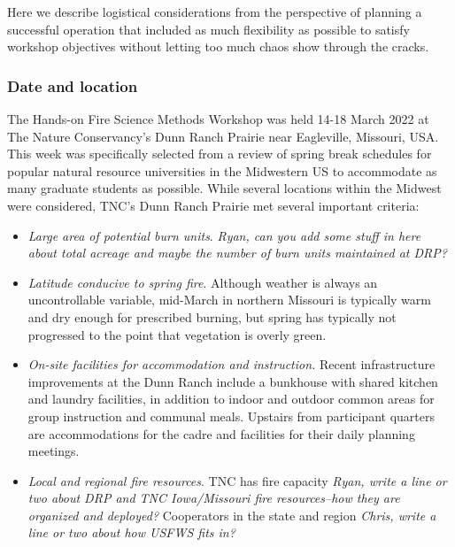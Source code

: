 \documentclass[fire,article,submit,moreauthors,pdftex]{Definitions/mdpi}
\begin{document}
Here we describe logistical considerations from the perspective of planning a successful operation that included as much flexibility as possible to satisfy workshop objectives without letting too much chaos show through the cracks.

\hypertarget{date-and-location}{%
\subsubsection{Date and location}\label{date-and-location}}

The Hands-on Fire Science Methods Workshop was held 14-18 March 2022 at The Nature Conservancy's Dunn Ranch Prairie near Eagleville, Missouri, USA.
This week was specifically selected from a review of spring break schedules for popular natural resource universities in the Midwestern US to accommodate as many graduate students as possible.
While several locations within the Midwest were considered, TNC's Dunn Ranch Prairie met several important criteria:

\begin{itemize}
\item
  \emph{Large area of potential burn units}. \emph{Ryan, can you add some stuff in here about total acreage and maybe the number of burn units maintained at DRP?}
\item
  \emph{Latitude conducive to spring fire}.
  Although weather is always an uncontrollable variable, mid-March in northern Missouri is typically warm and dry enough for prescribed burning, but spring has typically not progressed to the point that vegetation is overly green.
\item
  \emph{On-site facilities for accommodation and instruction.}
  Recent infrastructure improvements at the Dunn Ranch include a bunkhouse with shared kitchen and laundry facilities, in addition to indoor and outdoor common areas for group instruction and communal meals.
  Upstairs from participant quarters are accommodations for the cadre and facilities for their daily planning meetings.
\item
  \emph{Local and regional fire resources}.
  TNC has fire capacity \emph{Ryan, write a line or two about DRP and TNC Iowa/Missouri fire resources--how they are organized and deployed?}
  Cooperators in the state and region \emph{Chris, write a line or two about how USFWS fits in?}
\end{itemize}
\end{document}
